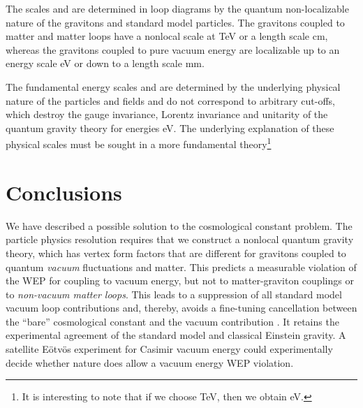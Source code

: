 \documentclass[a4paper,12pt]{article}
\begin{document}
The scales \coordHE{} and \coordHE{} are determined in
loop diagrams by the quantum non-localizable nature of the gravitons and
standard model particles. The gravitons coupled to matter and matter
loops have a nonlocal scale at \coordHE{} TeV or a
length scale \coordHE{} cm, whereas the gravitons coupled to
pure vacuum energy are localizable up to an energy scale
\coordHE{} eV or down to a length scale \coordHE{}
mm.

The fundamental energy scales \coordHE{} and
\coordHE{} are determined by the underlying physical nature
of the particles and fields and do not correspond to arbitrary cut-offs,
which destroy the gauge invariance, Lorentz invariance and unitarity of the
quantum gravity theory for energies \coordHE{} eV.
The underlying explanation of these physical scales must be sought in a
more fundamental theory\footnote{It is interesting to note that if we
choose \coordHE{} TeV, then we obtain
\coordHE{} eV.}

\section{\bf Conclusions}

We have described a possible solution to the cosmological
constant problem. The particle physics resolution requires that we
construct a nonlocal quantum gravity theory, which has vertex form factors
that are different for gravitons coupled to quantum {\it vacuum}
fluctuations and matter. This predicts a measurable violation of the WEP
for coupling to vacuum energy, but not to matter-graviton couplings or to
{\it non-vacuum matter loops}. This leads to a suppression of all standard
model vacuum loop contributions and, thereby, avoids a fine-tuning
cancellation between the ``bare'' cosmological constant \coordHE{} and
the vacuum contribution \coordHE{}. It retains the experimental
agreement of the standard model and classical Einstein gravity. A
satellite E\"otv\"os experiment for Casimir vacuum energy could
experimentally decide whether nature does allow a vacuum energy WEP
violation.
\end{document}
